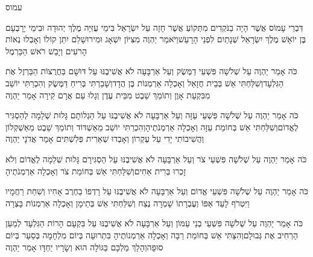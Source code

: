 \documentclass[../main/main.tex]{subfiles}
\begin{document}
\thispagestyle{empty}
\Incipit{}עמוס
\cleardoublepage
\RTLmulticolcolumns
\begin{multicols*}{\ncols}
דִּבְרֵי עָמוֹס אֲשֶׁר הָיָה בַנֹּקְדִים מִתְּקוֹעַ אֲשֶׁר חָזָה עַל יִשְׂרָאֵל בִּימֵי עֻזִּיָּה מֶלֶךְ יְהוּדָה וּבִימֵי יָרָבְעָם בֶּן יוֹאָשׁ מֶלֶךְ יִשְׂרָאֵל שְׁנָתַיִם לִפְנֵי הָרָעַשׁ\PreVerseSpace{}וַיֹּאמַר יַהְוֶה מִצִּיּוֹן יִשְׁאָג וּמִירוּשָׁלֵם יִתֵּן קוֹלוֹ וְאָבְלוּ נְאוֹת הָרֹעִים וְיָבֵשׁ רֹאשׁ הַכַּרְמֶל\OpenSection{}\par
{}כֹּה אָמַר יַהְוֶה עַל שְׁלֹשָׁה פִּשְׁעֵי דַמֶּשֶׂק וְעַל אַרְבָּעָה לֹא אֲשִׁיבֶנּוּ עַל דּוּשָׁם בַּחֲרֻצוֹת הַבַּרְזֶל אֶת הַגִּלְעָד\PreVerseSpace{}וְשִׁלַּחְתִּי אֵשׁ בְּבֵית חֲזָאֵל וְאָכְלָה אַרְמְנוֹת בֶּן הֲדָד\PreVerseSpace{}וְשָׁבַרְתִּי בְּרִיחַ דַּמֶּשֶׂק וְהִכְרַתִּי יוֹשֵׁב מִבִּקְעַת אָוֶן וְתוֹמֵךְ שֵׁבֶט מִבֵּית עֶדֶן וְגָלוּ עַם אֲרָם קִירָה אָמַר יַהְוֶה\OpenSection{}\par
{}כֹּה אָמַר יַהְוֶה עַל שְׁלֹשָׁה פִּשְׁעֵי עַזָּה וְעַל אַרְבָּעָה לֹא אֲשִׁיבֶנּוּ עַל הַגְלוֹתָם גָּלוּת שְׁלֵמָה לְהַסְגִּיר לֶאֱדוֹם\PreVerseSpace{}וְשִׁלַּחְתִּי אֵשׁ בְּחוֹמַת עַזָּה וְאָכְלָה אַרְמְנֹתֶיהָ\PreVerseSpace{}וְהִכְרַתִּי יוֹשֵׁב מֵאַשְׁדּוֹד וְתוֹמֵךְ שֵׁבֶט מֵאַשְׁקְלוֹן וַהֲשִׁיבוֹתִי יָדִי עַל עֶקְרוֹן וְאָבְדוּ שְׁאֵרִית פְּלִשְׁתִּים אָמַר אֲדֹנָי יַהְוֶה\OpenSection{}\par
{}כֹּה אָמַר יַהְוֶה עַל שְׁלֹשָׁה פִּשְׁעֵי צֹר וְעַל אַרְבָּעָה לֹא אֲשִׁיבֶנּוּ עַל הַסְגִּירָם גָּלוּת שְׁלֵמָה לֶאֱדוֹם וְלֹא זָכְרוּ בְּרִית אַחִים\PreVerseSpace{}וְשִׁלַּחְתִּי אֵשׁ בְּחוֹמַת צֹר וְאָכְלָה אַרְמְנֹתֶיהָ\OpenSection{}\par
{}כֹּה אָמַר יַהְוֶה עַל שְׁלֹשָׁה פִּשְׁעֵי אֱדוֹם וְעַל אַרְבָּעָה לֹא אֲשִׁיבֶנּוּ עַל רָדְפוֹ בַחֶרֶב אָחִיו וְשִׁחֵת רַחֲמָיו וַיִּטְרֹף לָעַד אַפּוֹ וְעֶבְרָתוֹ שָׁמְרָה\SubEnd{} נֶצַח
\PreVerseSpace{}וְשִׁלַּחְתִּי אֵשׁ בְּתֵימָן וְאָכְלָה אַרְמְנוֹת בָּצְרָה\OpenSection{}\par
{}כֹּה אָמַר יַהְוֶה עַל שְׁלֹשָׁה פִּשְׁעֵי בְנֵי עַמּוֹן וְעַל אַרְבָּעָה לֹא אֲשִׁיבֶנּוּ עַל בִּקְעָם הָרוֹת הַגִּלְעָד לְמַעַן הַרְחִיב אֶת גְּבוּלָם\PreVerseSpace{}וְהִצַּתִּי אֵשׁ בְּחוֹמַת רַבָּה וְאָכְלָה אַרְמְנוֹתֶיהָ בִּתְרוּעָה בְּיוֹם מִלְחָמָה בְּסַעַר בְּיוֹם סוּפָה\PreVerseSpace{}וְהָלַךְ מַלְכָּם בַּגּוֹלָה הוּא וְשָׂרָיו יַחְדָּו אָמַר יַהְוֶה\OpenSection{}\par

\end{multicols*}
\end{document}
